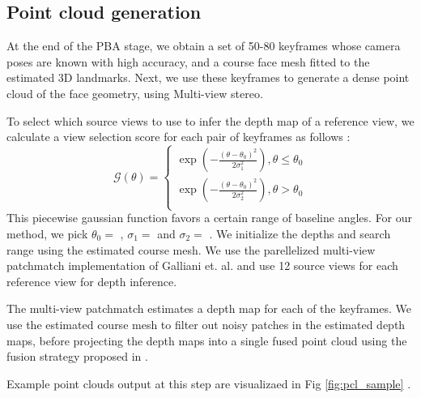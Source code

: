 \documentclass[10pt,twocolumn,letterpaper]{article}
\begin{document}
\subsection{Point cloud generation} \label{sec:pcl}

At the end of the PBA stage, we obtain a set of 50-80 keyframes whose camera poses are known with high accuracy, and a course face mesh fitted to the estimated 3D landmarks. Next, we use these keyframes to generate a dense point cloud of the face geometry, using Multi-view stereo.

To select which source views to use to infer the depth map of a reference view, we calculate a view selection score for each pair of keyframes as follows : 
\[ \mathcal{G}(\theta) =  \left\{
\begin{array}{ll}
      \exp(-\frac{(\theta - \theta_0)^2}{2\sigma_1^2}), \theta \leq \theta_0 \\
      \exp(-\frac{(\theta - \theta_0)^2}{2\sigma_2^2}), \theta > \theta_0 \\
\end{array} 
\right. \]
This piecewise gaussian function favors a certain range of baseline angles. For our method, we pick $\theta_{0} = $  , $\sigma_{1} =$  and $\sigma_2=$  .
We initialize the depths and search range using the estimated course mesh. We use the parellelized multi-view patchmatch implementation of Galliani et. al. \cite{galliani2015massively} and use 12 source views for each reference view for depth inference.

The multi-view patchmatch estimates a depth map for each of the keyframes. We use the estimated course mesh to filter out noisy patches in the estimated depth maps, before projecting the depth maps into a single fused point cloud using the fusion strategy proposed in \cite{galliani2015massively}.

Example point clouds output at this step are visualizaed in Fig \ref{fig:pcl_sample} . 
\end{document}
